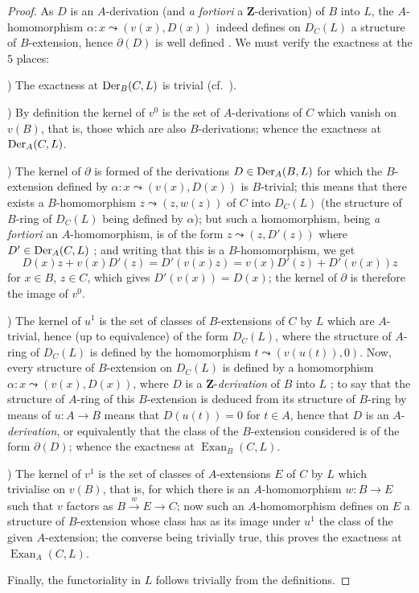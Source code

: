 \begin{proof}
As $D$ is an $A$-derivation (and \emph{a fortiori} a $\mathbf{Z}$-derivation) of $B$ into $L$, the $A$-homomorphism $\alpha:x\leadsto(v(x),D(x))$ indeed defines on $D_C(L)$ a structure of $B$-extension, hence $\partial(D)$ is well defined .
We must verify the exactness at the $5$ places:

\medskip
{})\enspace
The exactness at $\operatorname{Der}_B(C,L)$ is trivial (cf.\ ).

\medskip
{})\enspace
By definition  the kernel of $v^0$ is the set of $A$-derivations of $C$ which vanish on $v(B)$, that is, those which are also $B$-derivations; whence the exactness at $\operatorname{Der}_A(C,L)$.

\medskip
{})\enspace
The kernel of $\partial$ is formed of the derivations $D\in\operatorname{Der}_A(B,L)$ for which the $B$-extension defined by $\alpha:x\leadsto(v(x),D(x))$ is $B$-trivial; this means  that there exists a $B$-homomorphism $z\leadsto(z,w(z))$ of $C$ into $D_C(L)$ (the structure of $B$-ring of $D_C(L)$ being defined by $\alpha$); but such a homomorphism, being \emph{a fortiori} an $A$-homomorphism, is of the form $z\leadsto(z,D'(z))$ where $D'\in\operatorname{Der}_A(C,L)$ ; and writing that this is a $B$-homomorphism, we get
\[
  D(x)z+v(x)D'(z) = D'(v(x)z) = v(x)D'(z)+D'(v(x))z
\]
for $x\in B$, $z\in C$, which gives $D'(v(x))=D(x)$; the kernel of $\partial$ is therefore the image of $v^0$.

\medskip
{})\enspace
The kernel of $u^1$ is the set of classes of $B$-extensions of $C$ by $L$ which are $A$-trivial, hence (up to equivalence) of the form $D_C(L)$, where the structure of $A$-ring of $D_C(L)$ is defined by the homomorphism $t\leadsto(v(u(t)),0)$.
Now, every structure of $B$-extension on $D_C(L)$ is defined by a homomorphism $\alpha:x\leadsto(v(x),D(x))$, where $D$ is a $\mathbf{Z}$-\emph{derivation} of $B$ into $L$ ; to say that the structure of $A$-ring of this $B$-extension is deduced from its structure of $B$-ring by means of $u:A\to B$ means that $D(u(t))=0$ for $t\in A$, hence that $D$ is an $A$-\emph{derivation}, or equivalently that the class of the $B$-extension considered is of the form $\partial(D)$; whence the exactness at $\operatorname{Exan}_B(C,L)$.

\medskip
{})\enspace
The kernel of $v^1$ is the set of classes of $A$-extensions $E$ of $C$ by $L$ which trivialise on $v(B)$, that is, for which there is an $A$-homomorphism $w:B\to E$ such that $v$ factors as $B\xrightarrow{w}E\to C$; now such an $A$-homomorphism defines on $E$ a structure of $B$-extension whose class has as its image under $u^1$ the class of the given $A$-extension; the converse being trivially true, this proves the exactness at $\operatorname{Exan}_A(C,L)$.

Finally, the functoriality in $L$ follows trivially from the definitions.
\end{proof}

